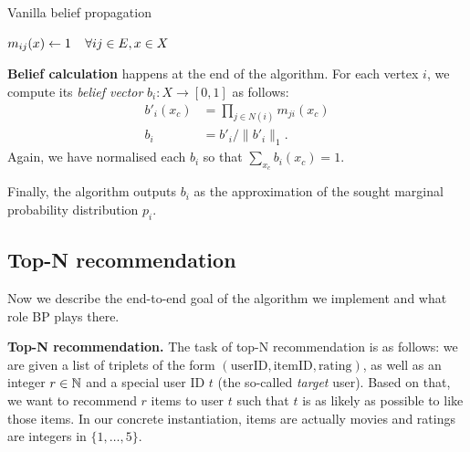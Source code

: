 \documentclass[final,letterpaper]{article}
\newcommand{\mypar}[1]{{\bf #1.}}
\newcommand{\myparcont}[1]{{\bf #1}}
\begin{document}
\begin{algorithm}
\caption{Vanilla belief propagation}
\label{algo:propagate}
\algodefaults
	$m_{ij}(x) \leftarrow 1\mkern 20mu\forall ij \in E, x \in X$\;
	
\end{algorithm}

\myparcont{Belief calculation} happens at the end of the algorithm. For each
vertex $i$, we compute its \emph{belief vector} $b_i: X \to [0, 1]$ as follows:
%
\begin{align*}
	b'_i(x_c) &= \prod_{j \in N(i)} m_{ji}(x_c) \\
	b_i &= b'_{i} / \|b'_i\|_1.
\end{align*}
%
Again, we have normalised each $b_i$ so that $\sum_{x_c} b_i(x_c) = 1$.

Finally, the algorithm outputs $b_i$ as the approximation of the sought
marginal probability distribution $p_i$.

\subsection{Top-N recommendation} \label{subsec:topn}

Now we describe the end-to-end goal of the algorithm we implement and what role
BP plays there.

\mypar{Top-N recommendation} The task of top-N recommendation is as follows: we
are given a list of triplets of the form $(\text{userID}, \text{itemID},
\text{rating})$, as well as an integer $r\in\mathbb{N}$ and a special user ID $t$ (the
so-called \emph{target} user). Based on that, we want to recommend $r$ items to
user $t$ such that $t$ is as likely as possible to like those items.
%
In our concrete instantiation, items are actually movies and ratings are
integers in $\{1, \ldots, 5\}$.
\end{document}
